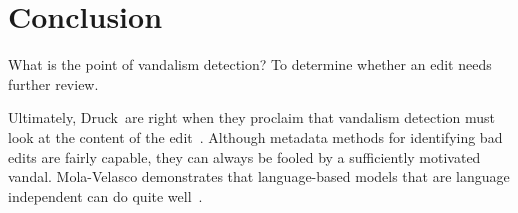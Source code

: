 \section{Conclusion}


What is the point of vandalism detection?
To determine whether an edit needs further review.

Ultimately, Druck~\etal are right when they proclaim that
vandalism detection must look at the content of the
edit~\cite{Druck2008}.
Although metadata methods for identifying bad edits are
fairly capable, they can always be fooled by a sufficiently
motivated vandal.
Mola-Velasco demonstrates that language-based
models that are language independent can do quite
well~\cite{Mola2011}.


